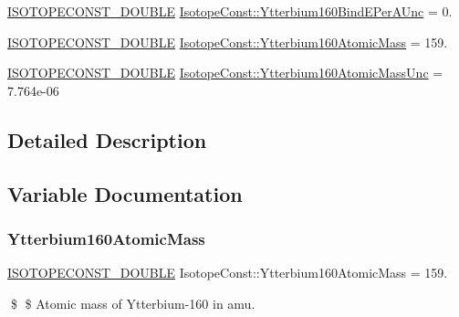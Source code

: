 \begin{DoxyCompactItemize}
\mbox{\hyperlink{group___isotope_const-_macros_ga8f45a7272ce02c0b4c65c44636ed719a}{I\+S\+O\+T\+O\+P\+E\+C\+O\+N\+S\+T\+\_\+\+D\+O\+U\+B\+LE}} \mbox{\hyperlink{group___isotope_const-_ytterbium-_yb160_ga80a08a307ee1329e34cacc631e65f078}{Isotope\+Const\+::\+Ytterbium160\+Bind\+E\+Per\+A\+Unc}} = 0.
\item 
\mbox{\hyperlink{group___isotope_const-_macros_ga8f45a7272ce02c0b4c65c44636ed719a}{I\+S\+O\+T\+O\+P\+E\+C\+O\+N\+S\+T\+\_\+\+D\+O\+U\+B\+LE}} \mbox{\hyperlink{group___isotope_const-_ytterbium-_yb160_ga12b8c2b665d0dbfacd6474bcfcebdc0a}{Isotope\+Const\+::\+Ytterbium160\+Atomic\+Mass}} = 159.
\item 
\mbox{\hyperlink{group___isotope_const-_macros_ga8f45a7272ce02c0b4c65c44636ed719a}{I\+S\+O\+T\+O\+P\+E\+C\+O\+N\+S\+T\+\_\+\+D\+O\+U\+B\+LE}} \mbox{\hyperlink{group___isotope_const-_ytterbium-_yb160_ga2228c79a058b03c5e9a7b04e1e80182b}{Isotope\+Const\+::\+Ytterbium160\+Atomic\+Mass\+Unc}} = 7.\+764e-\/06
\end{DoxyCompactItemize}


\subsection{Detailed Description}


\subsection{Variable Documentation}
\mbox{\label{group___isotope_const-_ytterbium-_yb160_ga12b8c2b665d0dbfacd6474bcfcebdc0a}} 
\subsubsection{\texorpdfstring{Ytterbium160\+Atomic\+Mass}{Ytterbium160AtomicMass}}
{\footnotesize\ttfamily \mbox{\hyperlink{group___isotope_const-_macros_ga8f45a7272ce02c0b4c65c44636ed719a}{I\+S\+O\+T\+O\+P\+E\+C\+O\+N\+S\+T\+\_\+\+D\+O\+U\+B\+LE}} Isotope\+Const\+::\+Ytterbium160\+Atomic\+Mass = 159.}

\$ \$ Atomic mass of Ytterbium-\/160 in amu. \mbox{\label{group___isotope_const-_ytterbium-_yb160_ga2228c79a058b03c5e9a7b04e1e80182b}} 
